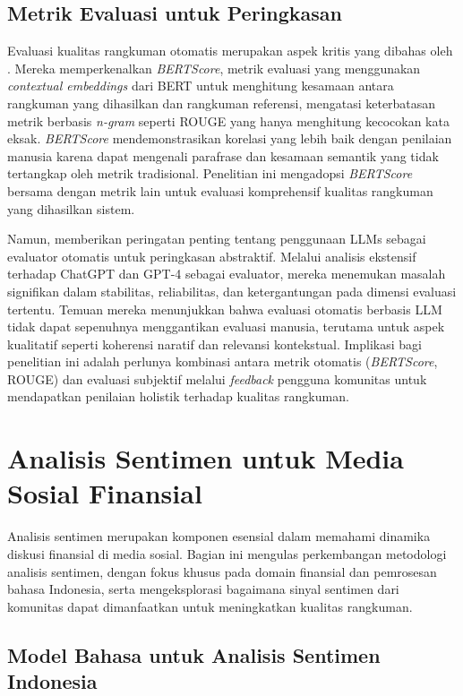\subsection{Metrik Evaluasi untuk Peringkasan}

Evaluasi kualitas rangkuman otomatis merupakan aspek kritis yang dibahas oleh \textcite{zhang2020bertscore}. Mereka memperkenalkan \textit{BERTScore}, metrik evaluasi yang menggunakan \textit{contextual embeddings} dari BERT untuk menghitung kesamaan antara rangkuman yang dihasilkan dan rangkuman referensi, mengatasi keterbatasan metrik berbasis \textit{n-gram} seperti ROUGE yang hanya menghitung kecocokan kata eksak. \textit{BERTScore} mendemonstrasikan korelasi yang lebih baik dengan penilaian manusia karena dapat mengenali parafrase dan kesamaan semantik yang tidak tertangkap oleh metrik tradisional. Penelitian ini mengadopsi \textit{BERTScore} bersama dengan metrik lain untuk evaluasi komprehensif kualitas rangkuman yang dihasilkan sistem.

Namun, \textcite{shen2023} memberikan peringatan penting tentang penggunaan LLMs sebagai evaluator otomatis untuk peringkasan abstraktif. Melalui analisis ekstensif terhadap ChatGPT dan GPT-4 sebagai evaluator, mereka menemukan masalah signifikan dalam stabilitas, reliabilitas, dan ketergantungan pada dimensi evaluasi tertentu. Temuan mereka menunjukkan bahwa evaluasi otomatis berbasis LLM tidak dapat sepenuhnya menggantikan evaluasi manusia, terutama untuk aspek kualitatif seperti koherensi naratif dan relevansi kontekstual. Implikasi bagi penelitian ini adalah perlunya kombinasi antara metrik otomatis (\textit{BERTScore}, ROUGE) dan evaluasi subjektif melalui \textit{feedback} pengguna komunitas untuk mendapatkan penilaian holistik terhadap kualitas rangkuman.

\section{Analisis Sentimen untuk Media Sosial Finansial}
\label{sec:sentiment-analysis}

Analisis sentimen merupakan komponen esensial dalam memahami dinamika diskusi finansial di media sosial. Bagian ini mengulas perkembangan metodologi analisis sentimen, dengan fokus khusus pada domain finansial dan pemrosesan bahasa Indonesia, serta mengeksplorasi bagaimana sinyal sentimen dari komunitas dapat dimanfaatkan untuk meningkatkan kualitas rangkuman.

\subsection{Model Bahasa untuk Analisis Sentimen Indonesia}

